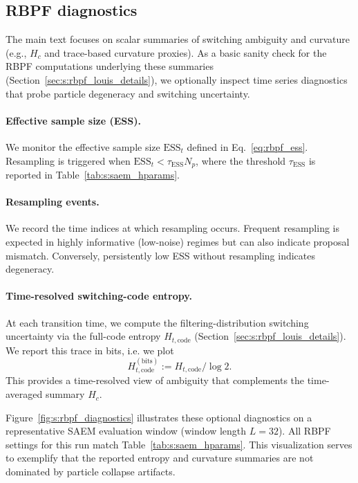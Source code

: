 \documentclass[twoside]{article}
\theoremstyle{plain}
\theoremstyle{definition}
\theoremstyle{remark}
\begin{document}
\subsection{RBPF diagnostics}
The main text focuses on scalar summaries of switching ambiguity and curvature (e.g., $H_c$ and trace-based curvature proxies).
As a basic sanity check for the RBPF computations underlying these summaries (Section~\ref{sec:s:rbpf_louis_details}), we optionally inspect time series diagnostics that probe particle degeneracy and switching uncertainty.

\paragraph{Effective sample size (ESS).}
We monitor the effective sample size $\mathrm{ESS}_t$ defined in Eq.~\eqref{eq:rbpf_ess}. Resampling is triggered when $\mathrm{ESS}_t < \tau_{\mathrm{ESS}}N_p$, where the threshold $\tau_{\mathrm{ESS}}$ is reported in Table~\ref{tab:s:saem_hparams}.

\paragraph{Resampling events.}
We record the time indices at which resampling occurs. Frequent resampling is expected in highly informative (low-noise) regimes but can also indicate proposal mismatch. Conversely, persistently low ESS without resampling indicates degeneracy.

\paragraph{Time-resolved switching-code entropy.}
At each transition time, we compute the filtering-distribution switching uncertainty via the full-code entropy $H_{t,\mathrm{code}}$ (Section~\ref{sec:s:rbpf_louis_details}). We report this trace in bits, i.e. we plot
\begin{equation}
H^{(\mathrm{bits})}_{t,\mathrm{code}} := H_{t,\mathrm{code}}/\log 2.
\end{equation}
This provides a time-resolved view of ambiguity that complements the time-averaged summary $H_c$.

Figure~\ref{fig:s:rbpf_diagnostics} illustrates these optional diagnostics on a representative SAEM evaluation window (window length $L=32$). All RBPF settings for this run match Table~\ref{tab:s:saem_hparams}. This visualization serves to exemplify that the reported entropy and curvature summaries are not dominated by particle collapse artifacts.
\end{document}
